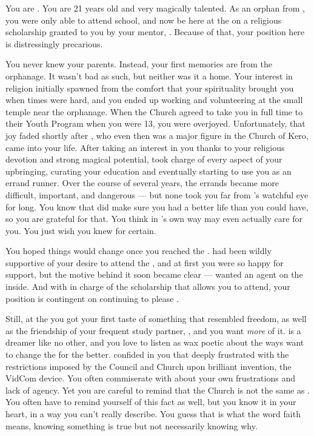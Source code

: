 \documentclass[char]{GL2020}
\begin{document}
\name{\cScholarship{}}

You are \cScholarship{\intro}. You are 21 years old and very magically talented. As an orphan from \pTech{}, you were only able to attend school, and now be here at the \pSchool{} on a religious scholarship granted to you by your mentor, \cAntiChup{\intro}. Because of that, your position here is distressingly precarious.

You never knew your parents. Instead, your first memories are from the orphanage. It wasn't bad as such, but neither was it a home. Your interest in religion initially spawned from the comfort that your spirituality brought you when times were hard, and you ended up working and volunteering at the small temple near the orphanage. When the Church agreed to take you in full time to their Youth Program when you were 13, you were overjoyed. Unfortunately, that joy faded shortly after \cAntiChup{}, who even then was a major figure in the Church of Kero, came into your life. After taking an interest in you thanks to your religious devotion and strong magical potential, \cAntiChup{} took charge of every aspect of your upbringing, curating your education and eventually starting to use you as an errand runner. Over the course of several years, the errands became more difficult, important, and dangerous — but none took you far from \cAntiChup{}'s watchful eye for long. You know that \cAntiChup{} did make sure you had a better life than you could have, so you are grateful for that. You think in \cAntiChup{}’s own way \cAntiChup{} may even actually care for you. You just wish you knew for certain.

You hoped things would change once you reached the \pSchool{}. \cAntiChup{} had been wildly supportive of your desire to attend the \pSc{}, and at first you were so happy for \cAntiChup{\their} support, but the motive behind it soon became clear — \cAntiChup{\they} wanted an agent on the inside. And with \cAntiChup{} in charge of the scholarship that allows you to attend, your position is contingent on continuing to please \cAntiChup{\them}. 

Still, at the \pSchool{} you got your first taste of something that resembled freedom, as well as the friendship of your frequent study partner, \cTechStar{\intro}, and you want \emph{more} of it. \cTechStar{} is a dreamer like no other, and you love to listen as \cTechStar{\they} wax\cTechStar{\verbes} poetic about the ways \cTechStar{\they} want\cTechStar{\verbs} to change the \pTech{} for the better. \cTechStar{\Theyhave} confided in you that \cTechStar{\theyare} deeply frustrated with the restrictions imposed by the Council and Church upon \cTechStar{\their} brilliant invention, the VidCom device. You often commiserate with \cTechStar{\them} about your own frustrations and lack of agency. Yet you are careful to remind \cTechStar{} that the Church is not the same as \cTechGod{\intro}. You often have to remind yourself of this fact as well, but you know it in your heart, in a way you can’t really describe. You guess that is what the word faith means, knowing something is true but not necessarily knowing why.
\end{document}
